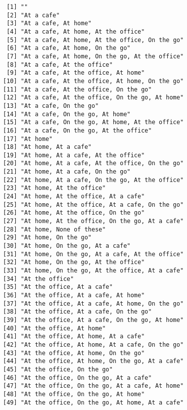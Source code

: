 \documentclass[
  letterpaper,
  DIV=11,
  numbers=noendperiod]{scrreprt}
\begin{document}
\begin{verbatim}
 [1] ""                                            
 [2] "At a cafe"                                   
 [3] "At a cafe, At home"                          
 [4] "At a cafe, At home, At the office"           
 [5] "At a cafe, At home, At the office, On the go"
 [6] "At a cafe, At home, On the go"               
 [7] "At a cafe, At home, On the go, At the office"
 [8] "At a cafe, At the office"                    
 [9] "At a cafe, At the office, At home"           
[10] "At a cafe, At the office, At home, On the go"
[11] "At a cafe, At the office, On the go"         
[12] "At a cafe, At the office, On the go, At home"
[13] "At a cafe, On the go"                        
[14] "At a cafe, On the go, At home"               
[15] "At a cafe, On the go, At home, At the office"
[16] "At a cafe, On the go, At the office"         
[17] "At home"                                     
[18] "At home, At a cafe"                          
[19] "At home, At a cafe, At the office"           
[20] "At home, At a cafe, At the office, On the go"
[21] "At home, At a cafe, On the go"               
[22] "At home, At a cafe, On the go, At the office"
[23] "At home, At the office"                      
[24] "At home, At the office, At a cafe"           
[25] "At home, At the office, At a cafe, On the go"
[26] "At home, At the office, On the go"           
[27] "At home, At the office, On the go, At a cafe"
[28] "At home, None of these"                      
[29] "At home, On the go"                          
[30] "At home, On the go, At a cafe"               
[31] "At home, On the go, At a cafe, At the office"
[32] "At home, On the go, At the office"           
[33] "At home, On the go, At the office, At a cafe"
[34] "At the office"                               
[35] "At the office, At a cafe"                    
[36] "At the office, At a cafe, At home"           
[37] "At the office, At a cafe, At home, On the go"
[38] "At the office, At a cafe, On the go"         
[39] "At the office, At a cafe, On the go, At home"
[40] "At the office, At home"                      
[41] "At the office, At home, At a cafe"           
[42] "At the office, At home, At a cafe, On the go"
[43] "At the office, At home, On the go"           
[44] "At the office, At home, On the go, At a cafe"
[45] "At the office, On the go"                    
[46] "At the office, On the go, At a cafe"         
[47] "At the office, On the go, At a cafe, At home"
[48] "At the office, On the go, At home"           
[49] "At the office, On the go, At home, At a cafe"

\end{verbatim}
\end{document}

